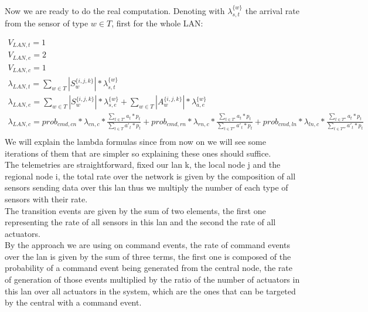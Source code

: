 \documentclass[11pt]{article}
\begin{document}
Now we are ready to do the real computation. Denoting with $\lambda^{\{w\}}_{s, t}$ the arrival rate from the sensor of type $w \in T$, first for the whole LAN:

\begin{equation}
    \begin{array}{l}
        V_{LAN, t} = 1 \\
        V_{LAN, e} = 2 \\ %
        V_{LAN,c} = 1 \\
        \lambda_{LAN, t} = \sum\limits_{w \in T}{| S^{\{i,j,k\}}_{w} | * \lambda^{\{w\}}_{s, t}}  \\
        \lambda_{LAN, e} = \sum\limits_{w \in T}{| S^{\{i,j,k\}}_{w} | * \lambda^{\{w\}}_{s, e}} + \sum\limits_{w \in T}{| A^{\{i,j,k\}}_{w} | * \lambda^{\{w\}}_{a, e}}\\
		\lambda_{LAN, c} = prob_{cmd,cn} * \lambda_{cn, c} * \frac{\sum\limits_{t \in T'}{a_{t} * p_{t}}}{\sum\limits_{t \in T}{a'_{t} * p_{t}}} + prob_{cmd,rn} * \lambda_{rn, c} *\frac{\sum\limits_{t \in T'}{a_{t} * p_{t}}}{\sum\limits_{t \in T''}{a'_{t} * p_{t}}}  + prob_{cmd,ln} * \lambda_{ln, c} * \frac{\sum\limits_{t \in T''}{a_{t} * p_{t}}}{\sum\limits_{t \in T'''}{a'_{t} * p_{t}}}  \\\

    \end{array}
\end{equation}
We will explain the lambda formulas since from now on we will see some iterations of them that are simpler so explaining these ones should suffice.\\
The telemetries are straightforward, fixed our lan k, the local node j and the regional node i, the total rate over the network is given by the composition of all sensors sending data over this lan thus we multiply the number of each type of sensors with their rate.\\
The transition events are given by the sum of two elements, the first one representing the rate of all sensors in this lan and the second the rate of all actuators.\\
By the approach we are using on command events, the rate of command events over the lan is given by the sum of three terms, the first one is composed of the probability of a command event being generated from the central node, the rate of generation of those events multiplied by the ratio of the number of actuators in this lan over all actuators in the system, which are the ones that can be targeted by the central with a command event.\\
\end{document}
